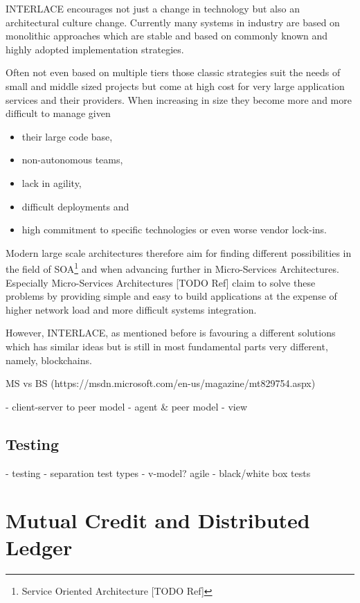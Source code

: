 INTERLACE encourages not just a change in technology but also an architectural culture change. Currently many systems in industry are based on monolithic approaches which are stable and based on commonly known and highly adopted implementation strategies.

Often not even based on multiple tiers those classic strategies suit the needs of small and middle sized projects but come at high cost for very large application services and their providers. When increasing in size they become more and more difficult to manage given

\begin{itemize}
	\item their large code base,
	\item non-autonomous teams,
	\item lack in agility,
	\item difficult deployments and
	\item high commitment to specific technologies or even worse vendor lock-ins.
\end{itemize}

Modern large scale architectures therefore aim for finding different possibilities in the field of SOA\footnote{Service Oriented Architecture [TODO Ref]} and when advancing further in Micro-Services Architectures. Especially Micro-Services Architectures [TODO Ref] claim to solve these problems by providing simple and easy to build applications at the expense of higher network load and more difficult systems integration.

However, INTERLACE, as mentioned before is favouring a different solutions which has similar ideas but is still in most fundamental parts very different, namely, blockchains.

MS vs BS (https://msdn.microsoft.com/en-us/magazine/mt829754.aspx)

  - client-server to peer model
  - agent \& peer model - view 

\subsection{Testing}

 - testing
 - separation test types
 - v-model? agile
 - black/white box tests

\section{Mutual Credit and Distributed Ledger}
\label{sec:dlt} 

